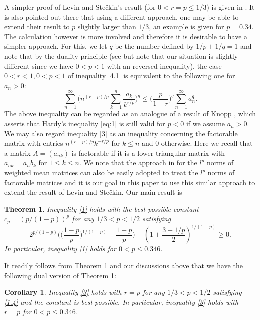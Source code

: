 \documentclass[11pt]{amsart}
\newtheorem{theorem}{Theorem}[section]
\newtheorem{cor}{Corollary}[section]
\numberwithin{equation}{section}
\theoremstyle{definition}
\theoremstyle{remark}
\begin{document}
   A simpler proof of Levin and Ste\v ckin's result (for $0< r=p \leq 1/3$) is given in \cite{G6}. It is also pointed out there that using a different approach,
   one may be able to extend
   their result to $p$ slightly larger than $1/3$, an example
   is given for $p=0.34$. The calculation however is more involved and therefore it is desirable to have a simpler approach.
   For this, we let $q$ be the number defined by $1/p+1/q=1$ and note that by the duality principle (see \cite[Lemma 2]{M} but note that our situation is slightly different since
    we have $0<p<1$ with an reversed inequality),
    the case $0<r<1, 0<p<1$ of inequality \eqref{4.1} is equivalent to the
    following one for $a_n>0$:
\begin{equation}
\label{3}
  \sum^{\infty}_{n=1}\Big( n^{(r-p)/p}\sum^{n}_{k=1}\frac {a_k}{k^{r/p}} \Big
  )^{q} \leq  \Big ( \frac {p}{1-r} \Big )^q \sum^{\infty}_{n=1}a^{q}_n.
\end{equation}
    The above inequality can be regarded as an analogue of a result of Knopp \cite{K}, which asserts that Hardy's
    inequality \eqref{eq:1} is still valid for $p<0$ if we assume $a_n>0$.
    We may also regard inequality \eqref{3} as an inequality concerning the factorable matrix with entries $n^{(r-p)/p}k^{-r/p}$ for $k \leq n$ and $0$ otherwise.
    Here we recall that a matrix $A=(a_{nk})$ is factorable if it is a lower triangular matrix
    with $a_{nk}=a_nb_k$ for $1 \leq k \leq n$. We note that the approach in \cite{G7} for the $l^p$ norms of weighted mean
    matrices can also be easily adopted to treat the $l^p$ norms
    of factorable matrices and it is our goal in this paper to use
   this similar approach to extend the result of Levin and Ste\v
   ckin. Our main result is
\begin{theorem}
\label{thm6}
  Inequality \eqref{1}
  holds with the best possible constant $c_p=(p/(1-p))^p$ for any $1/3<p<1/2$ satisfying
\begin{equation}
\label{1.4}
   2^{p/(1-p)}\Big (\Big(\frac {1-p}{p} \Big
)^{1/(1-p)}-\frac {1-p}{p}\Big ) -(1+\frac {3-1/p}2)^{1/(1-p)}
\geq 0.
\end{equation}
   In particular, inequality \eqref{1}
  holds for $0 < p  \leq 0.346$.
\end{theorem}

     It readily follows from Theorem \ref{thm6} and our discussions above that we have the
     following dual version of Theorem \ref{thm6}:
\begin{cor}
\label{dual}
   Inequality \eqref{3} holds with $r=p$ for any $1/3<p<1/2$ satisfying \eqref{1.4} and the constant is
   best possible. In particular, inequality \eqref{3} holds with
   $r=p$ for $0 < p  \leq 0.346$.
\end{cor}
\end{document}
